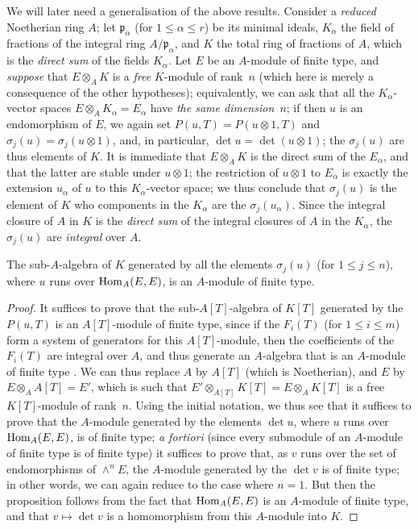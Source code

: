 \begin{remark}[6.4.7]
\label{II.6.4.7}
We will later need a generalisation of the above results.
Consider a \emph{reduced} Noetherian ring $A$;
let $\mathfrak{p}_\alpha$ (for $1\leq\alpha\leq r$) be its minimal ideals, $K_\alpha$ the field of fractions of the integral ring $A/\mathfrak{p}_\alpha$, and $K$ the total ring of fractions of $A$, which is the \emph{direct sum} of the fields $K_\alpha$.
Let $E$ be an $A$-module of finite type, and \emph{suppose} that $E\otimes_A K$ is a \emph{free} $K$-module of rank~$n$ (which here is merely a consequence of the other hypotheses);
equivalently, we can ask that all the $K_\alpha$-vector spaces $E\otimes_A K_\alpha=E_\alpha$ have \emph{the same dimension~$n$};
if then $u$ is an endomorphism of $E$, we again set $P(u,T)=P(u\otimes1,T)$ and $\sigma_j(u)=\sigma_j(u\otimes1)$, and, in particular, $\det u=\det(u\otimes1)$;
the $\sigma_j(u)$ are thus elements of $K$.
It is immediate that $E\otimes_A K$ is the direct sum of the $E_\alpha$, and that the latter are stable under $u\otimes1$;
the restriction of $u\otimes1$ to $E_\alpha$ is exactly the extension $u_\alpha$ of $u$ to this $K_\alpha$-vector space;
we thus conclude that $\sigma_j(u)$ is the element of $K$ who components in the $K_\alpha$ are the $\sigma_j(u_\alpha)$.
Since the integral closure of $A$ in $K$ is the \emph{direct sum} of the integral closures of $A$ in the $K_\alpha$, the $\sigma_j(u)$ are \emph{integral} over $A$.

\begin{lemma}[6.4.7.1]
\label{II.6.4.7.1}
The sub-$A$-algebra of $K$ generated by all the elements $\sigma_j(u)$ (for $1\leq j\leq n$), where $u$ runs over $\operatorname{Hom}_A(E,E)$, is an $A$-module of finite type.
\end{lemma}

\begin{proof}
It suffices to prove that the sub-$A[T]$-algebra of $K[T]$ generated by the $P(u,T)$ is an $A[T]$-module of finite type, since if the $F_i(T)$ (for $1\leq i\leq m$) form a system of generators for this $A[T]$-module, then the coefficients of the $F_i(T)$ are integral over $A$, and thus generate an $A$-algebra that is an $A$-module of finite type \cite[t.~I, p.~255, th.~1]{I-13}.
We can thus replace $A$ by $A[T]$ (which is Noetherian), and $E$ by $E\otimes_A A[T]=E'$, which is such that $E'\otimes_{A[T]}K[T]=E\otimes_A K[T]$ is a free $K[T]$-module of rank~$n$.
Using the initial notation, we thus see that it suffices to prove that the $A$-module generated by the elements $\det u$, where $u$ runs over $\operatorname{Hom}_A(E,E)$, is of finite type;
\emph{a fortiori} (since every submodule of an $A$-module of finite type is of finite type) it suffices to prove that, as $v$ runs over the set of endomorphisms of $\wedge^n E$, the $A$-module generated by the $\det v$ is of finite type;
in other words, we can again reduce to the case where $n=1$.
But then the proposition follows from the fact that $\operatorname{Hom}_A(E,E)$ is an $A$-module of finite type, and that $v\mapsto\det v$ is a homomorphism from this $A$-module into $K$.
\end{proof}


\end{remark}
